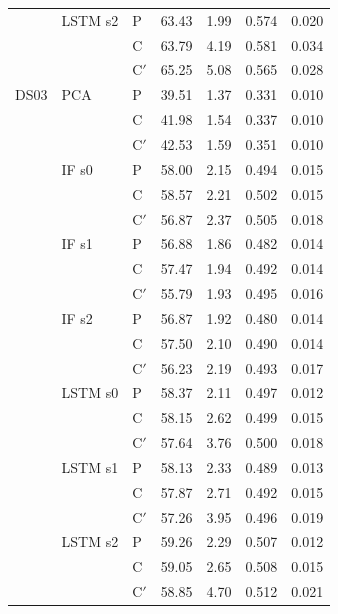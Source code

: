 \begin{scriptsize}
\begin{longtable}{lllrrrr}
 & LSTM s2 & P & 63.43 & 1.99 & 0.574 & 0.020 \\
 &  & C & 63.79 & 4.19 & 0.581 & 0.034 \\
 &  & C$'$ & 65.25 & 5.08 & 0.565 & 0.028 \\
\midrule
DS03 & PCA & P & 39.51 & 1.37 & 0.331 & 0.010 \\
 &  & C & 41.98 & 1.54 & 0.337 & 0.010 \\
 &  & C$'$ & 42.53 & 1.59 & 0.351 & 0.010 \\
 & IF s0 & P & 58.00 & 2.15 & 0.494 & 0.015 \\
 &  & C & 58.57 & 2.21 & 0.502 & 0.015 \\
 &  & C$'$ & 56.87 & 2.37 & 0.505 & 0.018 \\
 & IF s1 & P & 56.88 & 1.86 & 0.482 & 0.014 \\
 &  & C & 57.47 & 1.94 & 0.492 & 0.014 \\
 &  & C$'$ & 55.79 & 1.93 & 0.495 & 0.016 \\
 & IF s2 & P & 56.87 & 1.92 & 0.480 & 0.014 \\
 &  & C & 57.50 & 2.10 & 0.490 & 0.014 \\
 &  & C$'$ & 56.23 & 2.19 & 0.493 & 0.017 \\
 & LSTM s0 & P & 58.37 & 2.11 & 0.497 & 0.012 \\
 &  & C & 58.15 & 2.62 & 0.499 & 0.015 \\
 &  & C$'$ & 57.64 & 3.76 & 0.500 & 0.018 \\
 & LSTM s1 & P & 58.13 & 2.33 & 0.489 & 0.013 \\
 &  & C & 57.87 & 2.71 & 0.492 & 0.015 \\
 &  & C$'$ & 57.26 & 3.95 & 0.496 & 0.019 \\
 & LSTM s2 & P & 59.26 & 2.29 & 0.507 & 0.012 \\
 &  & C & 59.05 & 2.65 & 0.508 & 0.015 \\
 &  & C$'$ & 58.85 & 4.70 & 0.512 & 0.021 \\
\end{longtable}
\end{scriptsize}
